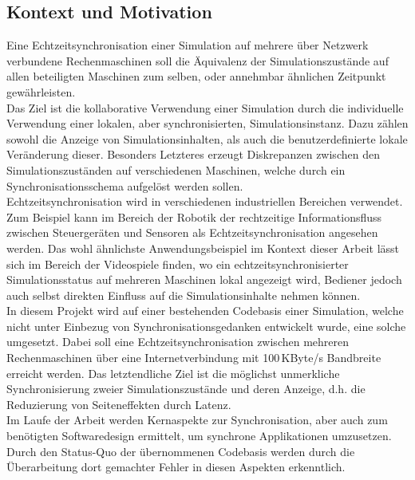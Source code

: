 

\subsection{Kontext und Motivation}
Eine Echtzeitsynchronisation einer Simulation auf mehrere über Netzwerk verbundene Rechenmaschinen soll die Äquivalenz der Simulationszustände auf allen beteiligten Maschinen zum selben, oder annehmbar ähnlichen Zeitpunkt gewährleisten.\\
Das Ziel ist die kollaborative Verwendung einer Simulation durch die individuelle Verwendung einer lokalen, aber synchronisierten, Simulationsinstanz.
Dazu zählen sowohl die Anzeige von Simulationsinhalten, als auch
die benutzerdefinierte lokale Veränderung dieser.
Besonders Letzteres erzeugt Diskrepanzen zwischen den Simulationszuständen auf verschiedenen Maschinen, welche durch ein Synchronisationsschema aufgelöst werden sollen.\\

Echtzeitsynchronisation wird in verschiedenen industriellen Bereichen verwendet. Zum Beispiel kann im Bereich der Robotik der rechtzeitige Informationsfluss zwischen Steuergeräten und Sensoren als Echtzeitsynchronisation angesehen werden.
Das wohl ähnlichste Anwendungsbeispiel im Kontext dieser Arbeit lässt sich im Bereich der Videospiele finden, wo ein echtzeitsynchronisierter Simulationsstatus auf mehreren Maschinen lokal angezeigt wird, Bediener jedoch auch selbst direkten Einfluss auf die Simulationsinhalte nehmen können.\\
In diesem Projekt wird auf einer bestehenden Codebasis einer Simulation, welche nicht unter Einbezug von Synchronisationsgedanken entwickelt wurde, eine solche umgesetzt. Dabei soll eine Echtzeitsynchronisation zwischen mehreren Rechenmaschinen über eine Internetverbindung mit 100\,KByte/s Bandbreite erreicht werden.
Das letztendliche Ziel ist die möglichst unmerkliche Synchronisierung zweier Simulationszustände und deren Anzeige, d.h. die Reduzierung von Seiteneffekten durch Latenz.\\
Im Laufe der Arbeit werden Kernaspekte zur Synchronisation, aber auch zum benötigten Softwaredesign ermittelt, um synchrone Applikationen umzusetzen. Durch den Status-Quo der übernommenen Codebasis werden durch die Überarbeitung dort gemachter Fehler in diesen Aspekten erkenntlich.


